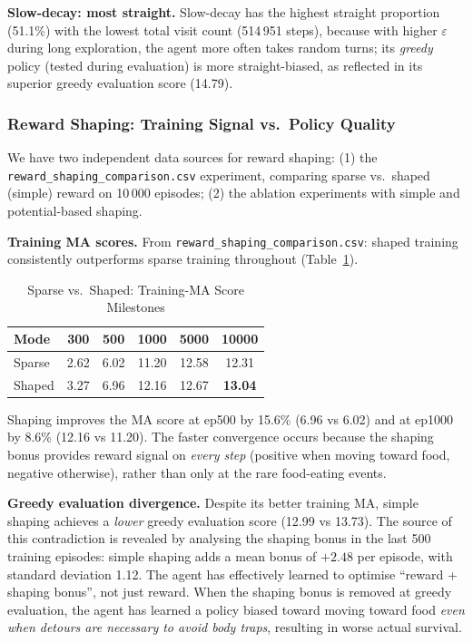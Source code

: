 \documentclass[10pt,conference]{IEEEtran}
\begin{document}
\textbf{Slow-decay: most straight.}
Slow-decay has the highest straight proportion (51.1\%) with the
lowest total visit count (514\,951 steps), because with higher
$\varepsilon$ during long exploration, the agent more often takes
random turns; its \emph{greedy} policy (tested during evaluation)
is more straight-biased, as reflected in its superior greedy
evaluation score (14.79).

\subsubsection{Reward Shaping: Training Signal vs.\ Policy Quality}

We have two independent data sources for reward shaping:
(1) the \texttt{reward\_shaping\_comparison.csv} experiment,
comparing sparse vs.\ shaped (simple) reward on 10\,000 episodes;
(2) the ablation experiments with simple and potential-based shaping.

\textbf{Training MA scores.}
From \texttt{reward\_shaping\_comparison.csv}:
shaped training consistently outperforms sparse training
throughout (Table~\ref{tab:shaping}).

\begin{table}[h]
  \centering
  \caption{Sparse vs.\ Shaped: Training-MA Score Milestones}
  \label{tab:shaping}
  \begin{tabular}{lccccc}
    \toprule
    Mode    & 300 & 500 & 1000 & 5000 & 10000 \\
    \midrule
    Sparse  & 2.62 & 6.02 & 11.20 & 12.58 & 12.31 \\
    Shaped  & 3.27 & 6.96 & 12.16 & 12.67 & \textbf{13.04} \\
    \bottomrule
  \end{tabular}
\end{table}

Shaping improves the MA score at ep500 by 15.6\% (6.96 vs 6.02)
and at ep1000 by 8.6\% (12.16 vs 11.20).
The faster convergence occurs because the shaping bonus
provides reward signal on \emph{every step} (positive when
moving toward food, negative otherwise), rather than only
at the rare food-eating events.

\textbf{Greedy evaluation divergence.}
Despite its better training MA, simple shaping achieves a
\emph{lower} greedy evaluation score (12.99 vs 13.73).
The source of this contradiction is revealed by analysing the
shaping bonus in the last 500 training episodes:
simple shaping adds a mean bonus of $+2.48$ per episode,
with standard deviation 1.12.
The agent has effectively learned to optimise
``reward + shaping bonus'', not just reward.
When the shaping bonus is removed at greedy evaluation,
the agent has learned a policy biased toward moving toward food
\emph{even when detours are necessary to avoid body traps},
resulting in worse actual survival.
\end{document}

